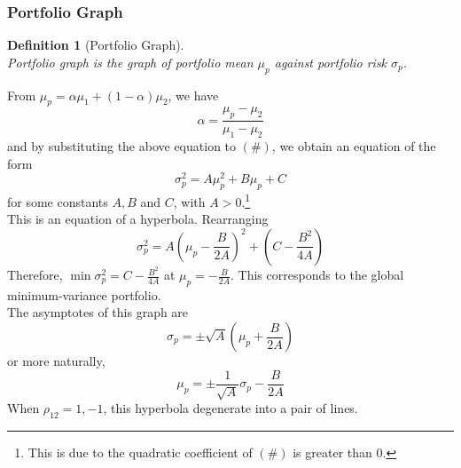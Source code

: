 \documentclass[12pt]{article}
\newtheorem{definition}{Definition}[section]
\theoremstyle{definition}
\begin{document}
\subsubsection{Portfolio Graph}
\begin{definition}[Portfolio Graph]
\hfill\\\normalfont Portfolio graph is the graph of portfolio mean $\mu_p$ against portfolio risk $\sigma_p$.\end{definition}
From $\mu_p = \alpha\mu_1+(1-\alpha)\mu_2$, we have
\[
\alpha = \frac{\mu_p-\mu_2}{\mu_1-\mu_2}
\]
and by substituting the above equation to $(\#)$, we obtain an equation of the form
\[
\sigma_p^2 = A\mu_p^2+B\mu_p+C
\]
for some constants $A,B$ and $C$, with $A>0$.\footnote{This is due to the quadratic coefficient of $(\#)$ is greater than 0.}\\
This is an equation of a hyperbola. Rearranging
\[
\sigma_p^2 = A(\mu_p-\frac{B}{2A})^2+(C-\frac{B^2}{4A})
\]
Therefore, $\min\sigma_p^2 = C-\frac{B^2}{4A}$ at $\mu_p = -\frac{B}{2A}$. This corresponds to the global minimum-variance portfolio.\\The asymptotes of this graph are
\[
\sigma_p = \pm \sqrt{A}(\mu_p+\frac{B}{2A})
\]
or more naturally,
\[
\mu_p = \pm\frac{1}{\sqrt{A}}\sigma_p -\frac{B}{2A}
\]
When $\rho_{12}=1,-1$, this hyperbola degenerate into a pair of lines.
\end{document}
